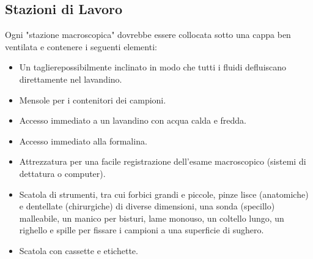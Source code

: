 \subsection{Stazioni di Lavoro}
Ogni "stazione macroscopica" dovrebbe essere collocata sotto una cappa ben ventilata e contenere i seguenti elementi:
\begin{itemize}
    \item Un taglierepossibilmente inclinato in modo che tutti i fluidi defluiscano direttamente nel lavandino.
    \item Mensole per i contenitori dei campioni.
    \item Accesso immediato a un lavandino con acqua calda e fredda.
    \item Accesso immediato alla formalina.
    \item Attrezzatura per una facile registrazione dell'esame macroscopico (sistemi di dettatura o computer).
    \item Scatola di strumenti, tra cui forbici grandi e piccole, pinze lisce (anatomiche) e dentellate  (chirurgiche) di diverse dimensioni, una sonda (specillo) malleabile, un manico per bisturi, lame monouso, un coltello lungo, un righello e spille per fissare i campioni a una superficie di sughero.
    \item Scatola con cassette e etichette.
\end{itemize}
% 
